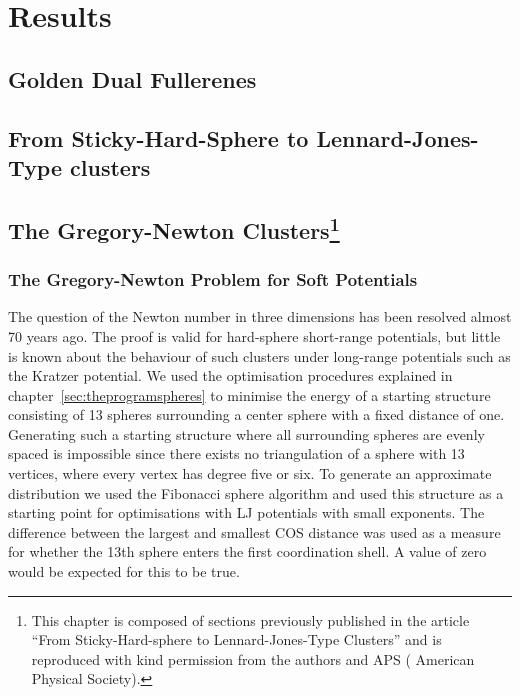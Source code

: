 
\part{Results}
\label{sec:results}

\chapter{Golden Dual Fullerenes}
\label{sec:goldendualfullerenes}

\chapter{From Sticky-Hard-Sphere to Lennard-Jones-Type clusters}
\label{sec:fromstickyhardspheretoLJtypeclusters}

\chapter[The Gregory-Newton Clusters]{
    The Gregory-Newton Clusters\footnote{This chapter is composed of sections
    previously published in the article ``From Sticky-Hard-sphere to
    Lennard-Jones-Type Clusters''\autocite{} and is reproduced with kind
    permission from the authors and APS ( American Physical
    Society).}
}
\label{sec:thegregorynewtonclusters}

\section{The Gregory-Newton Problem for Soft Potentials}
\label{sec:thegregorynewtonproblemforsoftpotentials}

The question of the Newton number in three dimensions has been resolved almost
70 years ago\autocite{schutte_problem_1952}. The proof is valid for hard-sphere
short-range potentials, but little is known about the behaviour of such
clusters under long-range potentials such as the Kratzer
potential\autocite{kratzer_ultraroten_1920}. We used the optimisation
procedures explained in chapter~\ref{sec:theprogramspheres} to minimise the
energy of a starting structure consisting of 13 spheres surrounding a center
sphere with a fixed distance of one. Generating such a starting structure where
all surrounding spheres are evenly spaced is impossible since there exists no
triangulation of a sphere with 13 vertices, where every vertex has degree five
or six\autocite{schwerdtfeger_topology_2015}. To generate an approximate
distribution we used the Fibonacci sphere
algorithm\autocite{gonzalez_measurement_2010,keinert_spherical_2015} and used
this structure as a starting point for optimisations with \ac{LJ} potentials
with small exponents. The difference between the largest and smallest \ac{COS}
distance was used as a measure for whether the 13th sphere enters the first
coordination shell. A value of zero would be expected for this to be true.

